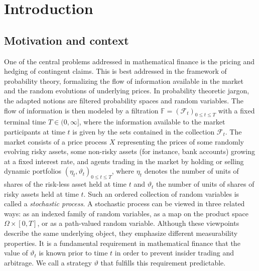 \documentclass[11pt,a4paper,twoside,openany]{report}
\numberwithin{equation}{section}
\theoremstyle{plain} %
\theoremstyle{definition} %
\theoremstyle{remark} %
\begin{document}
\cleardoublepage



\chapter{Introduction}
\label{chap:introduction}

\section{Motivation and context}
\label{sec:introduction-motivation-context}
One of the central problems addressed in mathematical finance is the pricing and hedging of contingent claims. This is best addressed in the framework of probability theory, formalizing the flow of information available in the market and the random evolutions of underlying prices. In probability theoretic jargon, the adapted notions are filtered probability spaces and random variables. The flow of information is then modeled by a filtration \(\mathbb{F}=(\mathcal{F}_t)_{0\leq t\leq T}\) with a fixed terminal time \(T\in(0,\infty]\), where the information available to the market participants at time \(t\) is given by the sets contained in the collection \(\mathcal{F}_t\). The market consists of a price process \(X\) representing the prices of some randomly evolving risky assets, some non-risky assets (for instance, bank accounts) growing at a fixed interest rate, and agents trading in the market by holding or selling dynamic portfolios \((\eta_t,\vartheta_t)_{0\leq t\leq T}\), where \(\eta_t\) denotes the number of units of shares of the risk-less asset held at time \(t\) and \(\vartheta_t\) the number of units of shares of risky assets held at time \(t\). 
Such an ordered collection of random variables is called a \textit{stochastic process}. A stochastic process can be viewed in three related ways: as an indexed family of random variables, as a map on the product space \(\Omega\times[0,T]\), or as a path-valued random variable. Although these viewpoints describe the same underlying object, they emphasize different measurability properties. 
It is a fundamental requirement in mathematical finance that the value of \(\vartheta_t\) is known prior to time \(t\) in order to prevent insider trading and arbitrage. We call a strategy \(\vartheta\) that fulfills this requirement predictable.
\end{document}
